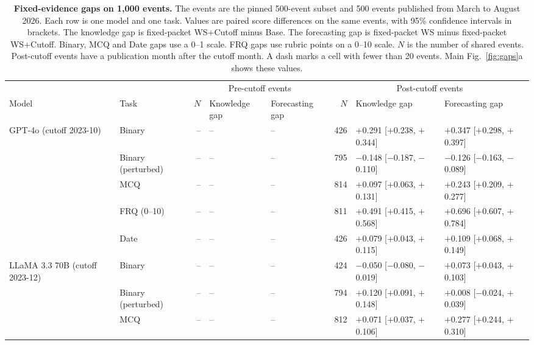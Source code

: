 \begin{table}[htbp]
\centering
\footnotesize
\caption{\textbf{Fixed-evidence gaps on 1,000 events.}
The events are the pinned 500-event subset and 500 events published from March to August 2026.
Each row is one model and one task.
Values are paired score differences on the same events, with 95\% confidence intervals in brackets.
The knowledge gap is fixed-packet WS+Cutoff minus Base.
The forecasting gap is fixed-packet WS minus fixed-packet WS+Cutoff.
Binary, MCQ and Date gaps use a 0--1 scale.
FRQ gaps use rubric points on a 0--10 scale.
$N$ is the number of shared events.
Post-cutoff events have a publication month after the cutoff month.
A dash marks a cell with fewer than 20 events.
Main Fig.~\ref{fig:gaps}a shows these values.}
\label{tab:si_ret_gaps_1000}
\begin{adjustbox}{max width=\textwidth}
\begin{tabular}{l l r l l r l l}
\toprule
& & \multicolumn{3}{c}{Pre-cutoff events} & \multicolumn{3}{c}{Post-cutoff events} \\
\cmidrule(lr){3-5}\cmidrule(lr){6-8}
Model & Task & $N$ & Knowledge gap & Forecasting gap & $N$ & Knowledge gap & Forecasting gap \\
\midrule
GPT-4o (cutoff 2023-10) & Binary & -- & -- & -- & 426 & $+$0.291 {\scriptsize[$+$0.238, $+$0.344]} & $+$0.347 {\scriptsize[$+$0.298, $+$0.397]} \\
 & Binary (perturbed) & -- & -- & -- & 795 & $-$0.148 {\scriptsize[$-$0.187, $-$0.110]} & $-$0.126 {\scriptsize[$-$0.163, $-$0.089]} \\
 & MCQ & -- & -- & -- & 814 & $+$0.097 {\scriptsize[$+$0.063, $+$0.131]} & $+$0.243 {\scriptsize[$+$0.209, $+$0.277]} \\
 & FRQ (0--10) & -- & -- & -- & 811 & $+$0.491 {\scriptsize[$+$0.415, $+$0.568]} & $+$0.696 {\scriptsize[$+$0.607, $+$0.784]} \\
 & Date & -- & -- & -- & 426 & $+$0.079 {\scriptsize[$+$0.043, $+$0.115]} & $+$0.109 {\scriptsize[$+$0.068, $+$0.149]} \\
\addlinespace
LLaMA 3.3 70B (cutoff 2023-12) & Binary & -- & -- & -- & 424 & $-$0.050 {\scriptsize[$-$0.080, $-$0.019]} & $+$0.073 {\scriptsize[$+$0.043, $+$0.103]} \\
 & Binary (perturbed) & -- & -- & -- & 794 & $+$0.120 {\scriptsize[$+$0.091, $+$0.148]} & $+$0.008 {\scriptsize[$-$0.024, $+$0.039]} \\
 & MCQ & -- & -- & -- & 812 & $+$0.071 {\scriptsize[$+$0.037, $+$0.106]} & $+$0.277 {\scriptsize[$+$0.244, $+$0.310]} \\

\end{tabular}
\end{adjustbox}
\end{table}
